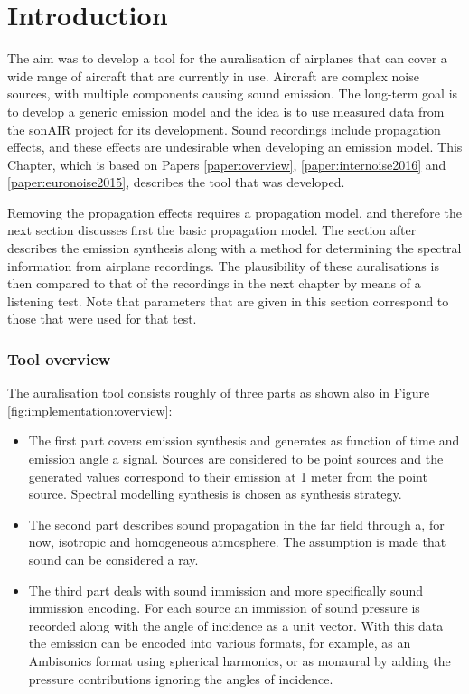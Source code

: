 \section{Introduction}

The aim was to develop a tool for the auralisation of airplanes that can cover a
wide range of aircraft that are currently in use. Aircraft are complex noise
sources, with multiple components causing sound emission. The long-term goal is
to develop a generic emission model and the idea is to use measured data
from the sonAIR project for its development. Sound
recordings include propagation effects, and these effects are undesirable when
developing an emission model. This Chapter, which is based on Papers
\ref{paper:overview}, \ref{paper:internoise2016} and \ref{paper:euronoise2015},
describes the tool that was developed.

Removing the propagation effects requires a propagation model, and therefore the
next section discusses first the basic propagation model. The section after
describes the emission synthesis along with a method for determining the
spectral information from airplane recordings. The plausibility of these
auralisations is then compared to that of the recordings in the next chapter by
means of a listening test. Note that parameters that are given in this section
correspond to those that were used for that test.


\subsubsection*{Tool overview}
The auralisation tool consists roughly of three parts as shown also in Figure
\ref{fig:implementation:overview}:

\begin{itemize}
\item The first part covers emission synthesis and generates as function of time and
emission angle a signal. Sources are considered to be point sources and the
generated values correspond to their emission at 1 meter from the point source.
Spectral modelling synthesis is chosen as synthesis strategy.

\item The second part describes sound propagation in the far field through a,
for now, isotropic and homogeneous atmosphere. The assumption is made that sound
can be considered a ray.

\item The third part deals with sound immission and more specifically sound immission
encoding. For each source an immission of sound pressure is recorded along with
the angle of incidence as a unit vector. With this data the emission can be
encoded into various formats, for example, as an Ambisonics format using
spherical harmonics, or as monaural by adding the pressure contributions
ignoring the angles of incidence.
\end{itemize}

